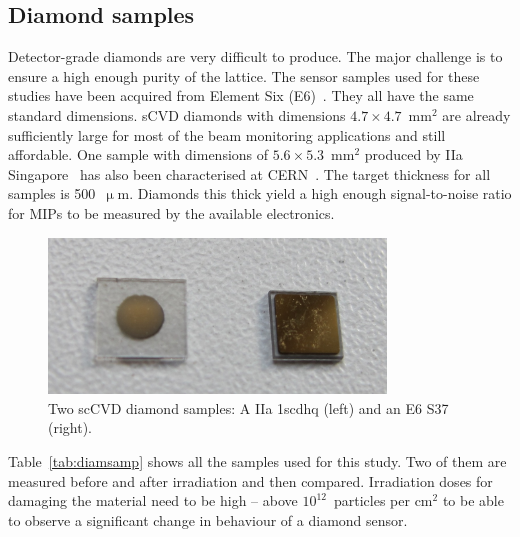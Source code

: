 \subsection{Diamond samples}
\label{sec:diamsam}
Detector-grade diamonds are very difficult to produce. The major challenge is to ensure a high enough purity of the lattice. %
The sensor samples used for these studies have been acquired from Element Six (E6)~\cite{E6:00000}. They all have the same standard dimensions. sCVD diamonds with dimensions $4.7\times4.7$~mm$^2$ are already sufficiently large for most of the beam monitoring applications and still affordable. 
One sample with dimensions of $5.6\times5.3$~mm$^2$ produced by IIa Singapore~\cite{IIA:00000} has also been characterised at CERN~\cite{IIA:00001}. The target thickness for all samples is 500~$\upmu$m. Diamonds this thick yield a high enough signal-to-noise ratio for MIPs to be measured by the available electronics.
\begin{figure}
\centering
\includegraphics[width=0.8\textwidth]{03_measurement_results/pics/setup/diamond4}
\caption{Two scCVD diamond samples: A IIa 1scdhq (left) and an E6 S37 (right).}
\label{fig:diams}
\end{figure}
Table~\ref{tab:diamsamp} shows all the samples used for this study. Two of them are measured before and after irradiation and then compared. Irradiation doses for damaging the material need to be high -- above $10^{12}$~particles per cm$^2$ to be able to observe a significant change in behaviour of a diamond sensor. 

